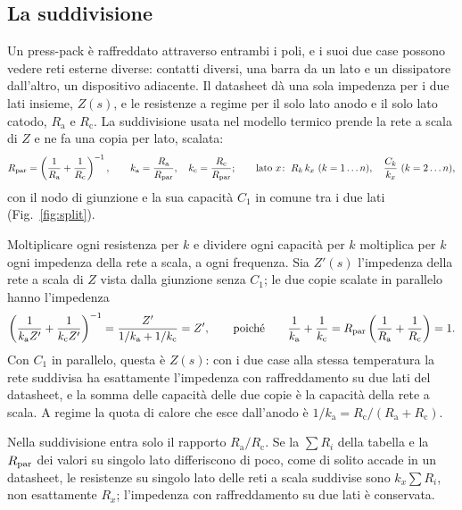 \documentclass[10pt,a4paper]{scrartcl}
\let\newcommand\fcitdefine
\newcommand{\Rpar}{R_\mathrm{par}}
\begin{document}
\subsection{La suddivisione}
Un press-pack è raffreddato attraverso entrambi i poli, e i suoi due case possono vedere reti esterne diverse: contatti diversi, una barra da un lato e un dissipatore dall'altro, un dispositivo adiacente. Il datasheet dà una sola impedenza per i due lati insieme, $Z(s)$, e le resistenze a regime per il solo lato anodo e il solo lato catodo, $R_\mathrm{a}$ e $R_\mathrm{c}$. La suddivisione usata nel modello termico prende la rete a scala di $Z$ e ne fa una copia per lato, scalata:
\begin{equation}
\Rpar = \left(\frac{1}{R_\mathrm{a}} + \frac{1}{R_\mathrm{c}}\right)^{-1} , \qquad k_\mathrm{a} = \frac{R_\mathrm{a}}{\Rpar} , \quad k_\mathrm{c} = \frac{R_\mathrm{c}}{\Rpar} ; \qquad
\text{lato } x\!: \ R_k\, k_x \ (k = 1\ldots n) , \quad \frac{C_k}{k_x} \ (k = 2\ldots n) ,
\label{eq:split}
\end{equation}
con il nodo di giunzione e la sua capacità $C_1$ in comune tra i due lati (Fig.~\ref{fig:split}).

Moltiplicare ogni resistenza per $k$ e dividere ogni capacità per $k$ moltiplica per $k$ ogni impedenza della rete a scala, a ogni frequenza. Sia $Z'(s)$ l'impedenza della rete a scala di $Z$ vista dalla giunzione senza $C_1$; le due copie scalate in parallelo hanno l'impedenza
\begin{equation}
\left(\frac{1}{k_\mathrm{a}Z'} + \frac{1}{k_\mathrm{c}Z'}\right)^{-1} = \frac{Z'}{1/k_\mathrm{a} + 1/k_\mathrm{c}} = Z' ,
\qquad\text{poiché}\qquad \frac{1}{k_\mathrm{a}} + \frac{1}{k_\mathrm{c}} = \Rpar\left(\frac{1}{R_\mathrm{a}} + \frac{1}{R_\mathrm{c}}\right) = 1 .
\end{equation}
Con $C_1$ in parallelo, questa è $Z(s)$: con i due case alla stessa temperatura la rete suddivisa ha esattamente l'impedenza con raffreddamento su due lati del datasheet, e la somma delle capacità delle due copie è la capacità della rete a scala. A regime la quota di calore che esce dall'anodo è $1/k_\mathrm{a} = R_\mathrm{c}/(R_\mathrm{a}+R_\mathrm{c})$.

Nella suddivisione entra solo il rapporto $R_\mathrm{a}/R_\mathrm{c}$. Se la $\sum R_i$ della tabella e la $\Rpar$ dei valori su singolo lato differiscono di poco, come di solito accade in un datasheet, le resistenze su singolo lato delle reti a scala suddivise sono $k_x\sum R_i$, non esattamente $R_x$; l'impedenza con raffreddamento su due lati è conservata.
\end{document}
